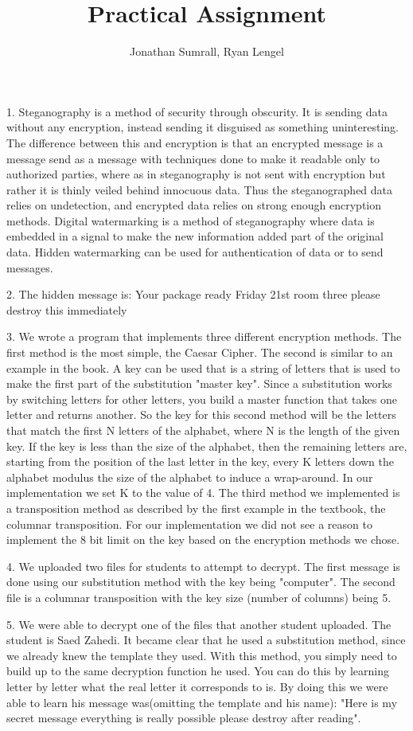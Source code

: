\documentclass[]{apa}
\affiliation{1DV200}
\author{Jonathan Sumrall, Ryan Lengel}
\title{Practical Assignment}
\begin{document}
\doublespace
\maketitle{}

1. Steganography is a method of security through obscurity. It is sending data without any encryption, instead sending it disguised as something uninteresting. The difference between this and encryption is that an encrypted message is a message send as a message with techniques done to make it readable only to authorized parties, where as in steganography is not sent with encryption but rather it is thinly veiled behind innocuous data. Thus the steganographed data relies on undetection, and encrypted data relies on strong enough encryption methods. Digital watermarking is a method of steganography where data is embedded in a signal to make the new information added part of the original data. Hidden watermarking can be used for authentication of data or to send messages. 

2. The hidden message is:
Your package ready Friday 21st room three please destroy this immediately 

3. We wrote a program that implements three different encryption methods. The first method is the most simple, the Caesar Cipher. The second is similar to an example in the book. A key can be used that is a string of letters that is used to make the first part of the substitution "master key".  Since a substitution works by switching letters for other letters, you build a master function that takes one letter and returns another. So the key for this second method will be the letters that match the first N letters of the alphabet, where N is the length of the given key. If the key is less than the size of the alphabet, then the remaining letters are, starting from the position of the last letter in the key, every K letters down the alphabet modulus the size of the alphabet to induce a wrap-around. In our implementation we set K to the value of 4. The third method we implemented is a transposition method as described by the first example in the textbook, the columnar transposition.  For our implementation we did not see a reason to implement the 8 bit limit on the key based on the encryption methods we chose. 


4. We uploaded two files for students to attempt to decrypt. The first message is done using our substitution method with the key being "computer". The second file is a columnar transposition with the key size (number of columns) being 5. 

5. We were able to decrypt one of the files that another student uploaded. The student is Saed Zahedi. It became clear that he used a substitution method, since we already knew the template they used. With this method,  you simply need to build up to the same decryption function he used. You can do this by learning letter by letter what the real letter it corresponds to is. By doing this we were able to learn his message was(omitting the template and his name): "Here is my secret message   everything is really possible  please destroy after reading".
\end{document}
